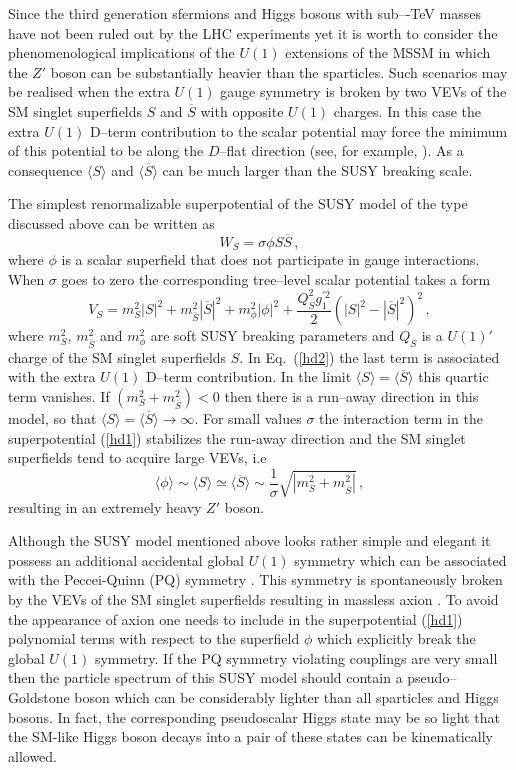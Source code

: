 \documentclass[12pt,a4paper]{article}
\newcommand{\be}{\begin{equation}}
\newcommand{\ee}{\end{equation}}
\newcommand{\ds}{\displaystyle}
\begin{document}
 Since the third generation sfermions and Higgs bosons with sub–-TeV
 masses have not been ruled out by the LHC experiments yet it is worth
 to consider the phenomenological implications of the $U(1)$
 extensions of the MSSM in which the $Z'$ boson can be substantially
 heavier than the sparticles. Such scenarios may be realised when the
 extra $U(1)$ gauge symmetry is broken by two VEVs of the SM singlet
 superfields $S$ and $\overline{S}$ with opposite $U(1)$ charges.  In
 this case the extra $U(1)$ D--term contribution to the scalar
 potential may force the minimum of this potential to be along the
 $D$--flat direction (see, for example, \cite{Kolda:1995iw}).  As a
 consequence $\langle S\rangle$ and $\langle\overline{S}\rangle$ can
 be much larger than the SUSY breaking scale.

The simplest renormalizable superpotential of the SUSY model of the type discussed above
can be written as
\be
W_S=\sigma \phi S \overline{S}\,,
\label{hd1}
\ee
where $\phi$ is a scalar superfield that does not participate in gauge interactions. When
$\sigma$ goes to zero the corresponding tree--level scalar potential takes a form
\begin{equation}
V_S = m^2_S |S|^2 + m^2_{\overline{S}} |\overline{S}|^2 + m^2_{\phi} |\phi|^2
+\ds\frac{Q_S^2 g^{'2}_1}{2}\left(|S|^2-|\overline{S}|^2\right)^2\,,
\label{hd2}
\end{equation}
where $m_S^2$, $m^2_{\overline{S}}$ and $m^2_{\phi}$ are soft SUSY breaking
parameters and $Q_S$ is a $U(1)'$ charge of the SM singlet superfields $S$. In Eq.~(\ref{hd2})
the last term is associated with the extra $U(1)$ D--term contribution. In the limit
$\langle S \rangle = \langle \overline{S} \rangle$ this quartic term vanishes. If
$(m^2_S + m^2_{\overline{S}})<0$ then there is a run--away direction in this
model, so that $\langle S \rangle = \langle \overline{S} \rangle \to \infty$.
For small values $\sigma$ the interaction term in the superpotential (\ref{hd1}) stabilizes
the run-away direction and the SM singlet superfields tend to acquire large VEVs,
i.e
\be
\langle \phi \rangle \sim \langle S \rangle \simeq \langle \overline{S} \rangle
\sim \dfrac{1}{\sigma}\sqrt{|m^2_S + m^2_{\overline{S}}|}\,,
\label{hd3}
\ee
resulting in an extremely heavy $Z'$ boson.

Although the SUSY model mentioned above looks rather simple and elegant it
possess an additional accidental global $U(1)$ symmetry which can be
associated with the Peccei-Quinn (PQ) symmetry \cite{Peccei:1977hh}.
This symmetry is spontaneously broken by the VEVs of the SM singlet superfields
resulting in massless axion \cite{axion}. To avoid the appearance of axion
one needs to include in the superpotential (\ref{hd1}) polynomial terms with respect
to the superfield $\phi$ which explicitly break the global $U(1)$ symmetry. If the PQ
symmetry violating couplings are very small then the particle spectrum of this
SUSY model should contain a pseudo--Goldstone boson which can be considerably
lighter than all sparticles and Higgs bosons. In fact, the corresponding pseudoscalar
Higgs state may be so light that the SM-like Higgs boson decays into a pair of
these states can be kinematically allowed.
\end{document}
